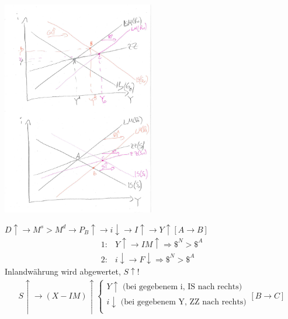 \documentclass{scrartcl}
\begin{document}
\begin{enumerate}[a)]
\begin{itemize}
\begin{center}
  \includegraphics[width=0.5\textwidth]{Bilder/MF3.pdf}
\end{center}
    $D\uparrow \rightarrow M^s>M^d \rightarrow P_B \uparrow \rightarrow i \downarrow \rightarrow I \uparrow \rightarrow Y \uparrow [A\rightarrow B]$
    \begin{align*}
    1:& Y\uparrow \rightarrow IM \uparrow \Rightarrow \$^{N}>\$^{A}\\
    2:& i\downarrow \rightarrow F \downarrow \Rightarrow \$^{N}>\$^{A}
    \end{align*}
    Inlandw\"{a}hrung wird abgewertet, $S\uparrow$!
    \begin{align*}
      S\uparrow \rightarrow (X-IM)\uparrow \begin{cases}
        Y \uparrow \text{ (bei gegebenem i, IS nach rechts)}\\
        i \downarrow \text{ (bei gegebenem Y, ZZ nach rechts)}\\
      \end{cases}
      [B \rightarrow C]
    \end{align*}


\end{itemize}
\end{enumerate}
\end{document}
